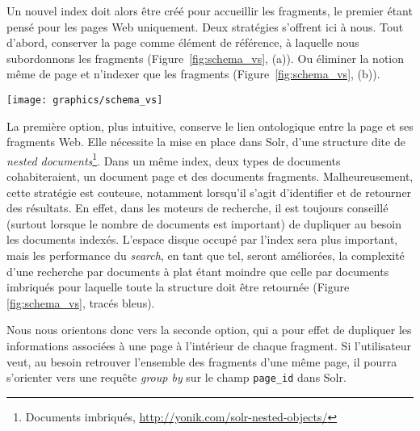\documentclass[symmetric,justified,marginals=raggedouter]{tufte-book}
\begin{document}
Un nouvel index doit alors être créé pour accueillir les fragments, le premier étant pensé pour les pages Web uniquement. Deux stratégies s'offrent ici à nous. Tout d'abord, conserver la page comme élément de référence, à laquelle nous subordonnons les fragments (Figure~\ref{fig:schema_vs}, (a)). Ou éliminer la notion même de page et n'indexer que les fragments (Figure~\ref{fig:schema_vs}, (b)). 

\begin{figure*}%
  \texttt{[image: graphics/schema\_vs]}
  \caption{Différentes stratégies d'indexation du fragment Web dans un moteur de recherche et complexité de la recherche (bleu)}
  \label{fig:schema_vs}
\end{figure*} 

\noindent La première option, plus intuitive, conserve le lien ontologique entre la page et ses fragments Web. Elle nécessite la mise en place dans Solr, d'une structure dite de \textit{nested documents}\footnote{\RaggedOuter Documents imbriqués, \url{http://yonik.com/solr-nested-objects/}}. Dans un même index, deux types de documents cohabiteraient, un document page et des documents fragments. Malheureusement, cette stratégie est couteuse, notamment lorsqu'il s'agit d'identifier et de retourner des résultats. En effet, dans les moteurs de recherche, il est toujours conseillé (surtout lorsque le nombre de documents est important) de dupliquer au besoin les documents indexés. L'espace disque occupé par l'index sera plus important, mais les performance du \textit{search}, en tant que tel, seront améliorées, la complexité d'une recherche par documents à plat étant moindre que celle par documents imbriqués pour laquelle toute la structure doit être retournée (Figure  \ref{fig:schema_vs}, tracés bleus). 

Nous nous orientons donc vers la seconde option, qui a pour effet de dupliquer les informations associées à une page à l'intérieur de chaque fragment. Si l'utilisateur veut, au besoin retrouver l'ensemble des fragments d'une même page, il pourra s'orienter vers une requête \textit{group by} sur le champ \texttt{page\_id} dans Solr. 
\end{document}
